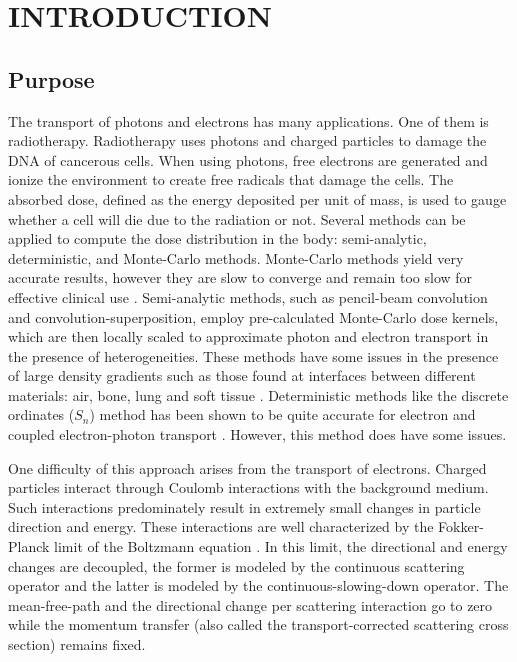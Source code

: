 \pagestyle{plain}
\setcounter{page}{1}
\chapter{\uppercase{Introduction}}
\section{Purpose}
The transport of photons and electrons has many applications. One of them is 
radiotherapy. Radiotherapy uses photons and charged particles to 
damage the DNA of cancerous cells. When using photons, free electrons are 
generated and ionize the environment to create free radicals that damage the cells. 
The absorbed dose, defined as the energy deposited per unit of mass, is used to 
gauge whether a cell will die due to the radiation or not. Several methods can be
applied to compute the dose distribution in the body: semi-analytic,
deterministic, and Monte-Carlo methods. Monte-Carlo methods yield very
accurate results, however they are slow to converge and remain too slow for
effective clinical use \cite{acuros,comet}. Semi-analytic methods, such as
pencil-beam convolution and convolution-superposition, employ pre-calculated
Monte-Carlo dose kernels, which are then locally scaled to approximate photon
and electron transport in the presence of heterogeneities. These methods
have some issues in the presence of large density gradients such as those
found at interfaces between different materials: air, bone, lung and soft
tissue \cite{krieger,seco,acuros}. Deterministic methods like the discrete 
ordinates ($S_n$) method has been shown to be quite accurate for electron and 
coupled electron-photon transport \cite{accuracy_2,morel_81,accuracy_1}.
However, this method does have some issues.

One difficulty of this approach arises from the transport of electrons. Charged 
particles interact through Coulomb interactions with the  background medium. 
Such interactions predominately result in extremely small changes in particle 
direction and energy. These interactions are well characterized by the 
Fokker-Planck limit of the Boltzmann equation \cite{fp_limit,morel_96}. In this 
limit, the directional and energy changes are decoupled, the former is modeled 
by the continuous scattering operator and the latter is modeled by the 
continuous-slowing-down operator. The mean-free-path and the directional 
change per scattering interaction go to zero while the momentum transfer (also 
called the transport-corrected scattering cross section) remains fixed.

